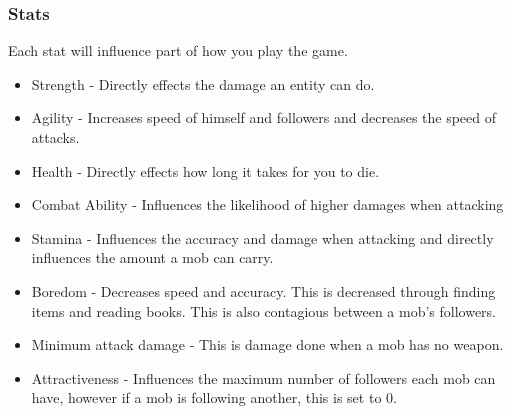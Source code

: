 \documentclass[../Main.tex]{subfiles}
\begin{document}
        \subsubsection{Stats}
            Each stat will influence part of how you play the game. %
            \begin{itemize}
                \item Strength - Directly effects the damage an entity can do.
                \item Agility - Increases speed of himself and followers and decreases the speed of attacks.
                \item Health - Directly effects how long it takes for you to die.
                \item Combat Ability - Influences the likelihood of higher damages when attacking
                \item Stamina - Influences the accuracy and damage when attacking and directly influences the amount a mob can carry.
                \item Boredom - Decreases speed and accuracy. This is decreased through finding items and reading books. This is also contagious between a mob's followers.
                \item Minimum attack damage - This is damage done when a mob has no weapon.
                \item Attractiveness - Influences the maximum number of followers each mob can have, however if a mob is following another, this is set to 0.
            \end{itemize}
\end{document}
